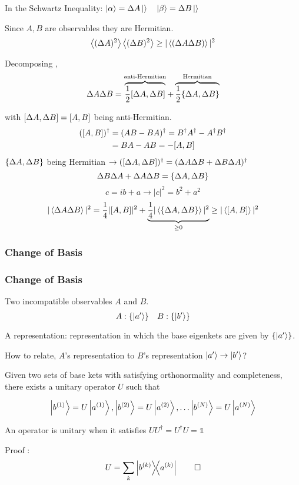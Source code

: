 \begin{frame}
	In the Schwartz Inequality:  $ \ket{\alpha} = \Delta A \ket{} \quad \ket\beta = \Delta B \ket{}$

	Since $A,B$ are observables they are Hermitian. $$\ev{(\Delta A)^2}\ev{(\Delta B)^2} \ge |\ev{(\Delta A \Delta B)}|^2$$

	Decomposing ,
	\begin{gather*}
		\Delta A \Delta B = \overbrace{\frac{1}{2}\comm{\Delta A}{\Delta B}}^{\text{anti-Hermitian}} + \overbrace{\frac{1}{2} \acomm{\Delta A}{\Delta B}}^{\text{Hermitian}}
	\end{gather*}
\end{frame}
\begin{frame}
	with $\comm{\Delta A}{\Delta B} = \comm{A }{B }$ being anti-Hermitian.
	\begin{align*}
		(\comm{A}{B})^\dag & = (AB - BA)^\dag = B^\dag A^\dag - A^\dag B^\dag \\
		                   & = BA - AB = -\comm{A}{B}
	\end{align*}
	$\acomm{\Delta A}{\Delta B}$ being Hermitian $\to (\comm{\Delta A}{\Delta B})^\dag = (\Delta A \Delta B + \Delta B \Delta A)^\dag$
	$$ \Delta B \Delta A + \Delta A \Delta B = \acomm{\Delta A}{\Delta B}$$
	\[
		c = ib + a \to |c|^2 = b^2+a^2
	\]
	\[
		|\ev{\Delta A \Delta B}|^2 = \frac14 |\comm{A}{B}|^2 + \underbrace{\frac14 |\ev{\acomm{\Delta A}{\Delta B}}|^2}_{\ge 0 } \ge |\ev{\comm{A}{B}}|^2
	\]

\end{frame}

\subsubsection{Change of Basis}
\begin{frame}
	\frametitle{Change of Basis}
	Two incompatible observables $A$ and $B$. \[A : \{\ket{a'}\} \quad B: \{\ket{b'}\}\]

	A representation: representation in which the base eigenkets are given by $\{ \ket{a'}\}$.

	How to relate, $A$'s  representation to $B$'s representation $\ket{a'} \to \ket{b'}$?

	\begin{theorem}[3]
		Given two sets of base kets with satisfying orthonormality and completeness, there exists a unitary operator
		$U$ such that

		\[
			\ket{b^{(1)}} = U \ket{a^{(1)}},\ket{b^{(2)}} = U \ket{a^{(2)}}, \dots \ket{b^{(N)}} = U \ket{a^{(N)}}
		\]
	\end{theorem}
	An operator is unitary when it satisfies $UU^\dag = U^\dag U = \mathbb{1}$

	Proof :
	\[
		U= \sum_k \op{b^{(k)}}{a^{(k)}} \qed
	\]

\end{frame}

